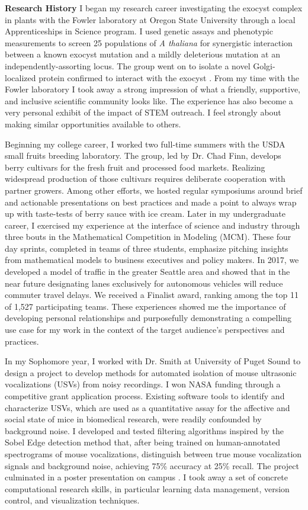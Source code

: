 \textbf{Research History}
I began my research career investigating the exocyst complex in plants with the Fowler laboratory at Oregon State University through a local Apprenticeships in Science program.
I used genetic assays and phenotypic measurements to screen 25 populations of \textit{A thaliana} for synergistic interaction between a known exocyst mutation and a mildly deleterious mutation at an independently-assorting locus.
The group went on to isolate a novel Golgi-localized protein confirmed to interact with the exocyst \cite{fowler}.
From my time with the Fowler laboratory I took away a strong impression of what a friendly, supportive, and inclusive scientific community looks like.
The experience has also become a very personal exhibit of the impact of STEM outreach.
I feel strongly about making similar opportunities available to others.

Beginning my college career, I worked two full-time summers with the USDA small fruits breeding laboratory.
The group, led by Dr. Chad Finn, develops berry cultivars for the fresh fruit and processed food markets.
Realizing widespread production of those cultivars requires deliberate cooperation with partner growers.
Among other efforts, we hosted regular symposiums around brief and actionable presentations on best practices and made a point to always wrap up with taste-tests of berry sauce with ice cream.
Later in my undergraduate career, I exercised my experience at the interface of science and industry through three bouts in the Mathematical Competition in Modeling (MCM).
These four day sprints, completed in teams of three students, emphasize pitching insights from mathematical models to business executives and policy makers.
In 2017, we developed a model of traffic in the greater Seattle area and showed that in the near future designating lanes exclusively for autonomous vehicles will reduce commuter travel delays.
We received a Finalist award, ranking among the top 11 of 1,527 participating teams.
These experiences showed me the importance of developing personal relationships and purposefully demonstrating a compelling use case for my work in the context of the target audience's perspectives and practices.

In my Sophomore year, I worked with Dr. Smith at University of Puget Sound to design a project to develop methods for automated isolation of mouse
ultrasonic vocalizations (USVs) from noisy recordings.
I won NASA funding through a competitive grant application process.
Existing software tools to identify and characterize USVs, which are used as a quantitative assay for the affective and social state of mice in biomedical research, were readily confounded by background noise.
I developed and tested filtering algorithms inspired by the Sobel Edge detection method that, after being trained on human-annotated spectrograms of mouse vocalizations, distinguish between true mouse vocalization signals and background noise, achieving 75\% accuracy at 25\% recall.
The project culminated in a poster presentation on campus \cite{smith}.
I took away a set of concrete computational research skills, in particular learning data management, version control, and visualization techniques.

